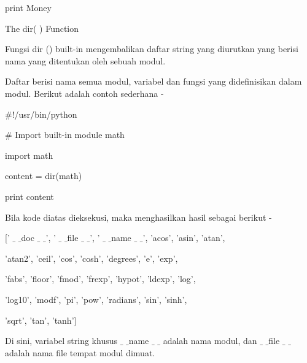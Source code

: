 \noindent 
 \hspace*{0.5in} print Money \par
\vspace{12pt}
\noindent 
The dir( ) Function \par
\noindent 
Fungsi dir () built-in mengembalikan daftar string yang diurutkan yang berisi nama yang ditentukan oleh sebuah modul. \par
\noindent 
Daftar berisi nama semua modul, variabel dan fungsi yang didefinisikan dalam modul. Berikut adalah contoh sederhana - \par
\noindent 
 \hspace*{0.5in}  $  \#  $!/usr/bin/python \par
\vspace{12pt}
\noindent 
 \hspace*{0.5in}  $  \#  $ Import built-in module math \par
\noindent 
 \hspace*{0.5in} import math \par
\vspace{12pt}
\noindent 
 \hspace*{0.5in} content = dir(math) \par
\vspace{12pt}
\noindent 
 \hspace*{0.5in} print content \par
\noindent 
Bila kode diatas dieksekusi, maka menghasilkan hasil sebagai berikut - \par
\noindent 
 \hspace*{0.5in} [' $  \_  $ $  \_  $doc $  \_  $ $  \_  $', ' $  \_  $ $  \_  $file $  \_  $ $  \_  $', ' $  \_  $ $  \_  $name $  \_  $ $  \_  $', 'acos', 'asin', 'atan',  \par
\noindent 
 \hspace*{0.5in} 'atan2', 'ceil', 'cos', 'cosh', 'degrees', 'e', 'exp',  \par
\noindent 
 \hspace*{0.5in} 'fabs', 'floor', 'fmod', 'frexp', 'hypot', 'ldexp', 'log', \par
\noindent 
 \hspace*{0.5in} 'log10', 'modf', 'pi', 'pow', 'radians', 'sin', 'sinh',  \par
\noindent 
 \hspace*{0.5in} 'sqrt', 'tan', 'tanh'] \par
\noindent 
Di sini, variabel string khusus  $  \_  $ $  \_  $name $  \_  $ $  \_  $ adalah nama modul, dan  $  \_  $ $  \_  $file $  \_  $ $  \_  $ adalah nama file tempat modul dimuat. \par
